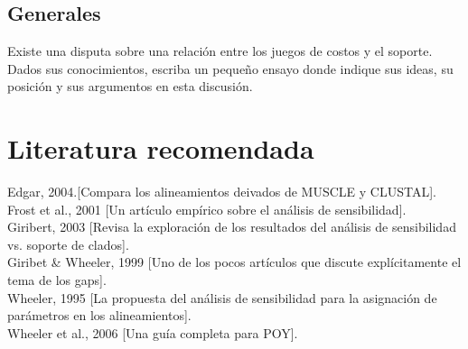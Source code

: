 \subsection{Generales}
\noindent
Existe una disputa sobre una relaci\'on entre los juegos de costos y el soporte. Dados sus conocimientos, escriba un 
peque\~no ensayo donde indique sus ideas, su posici\'on y sus argumentos en esta discusi\'on.
\section{Literatura recomendada}
\noindent
Edgar, 2004.[Compara los alineamientos deivados de MUSCLE y CLUSTAL].\\
Frost et al., 2001 [Un art\'iculo emp\'irico sobre el an\'alisis de sensibilidad].\\
Giribert, 2003 [Revisa la exploraci\'on de los resultados del an\'alisis de sensibilidad vs. soporte de clados].\\
Giribet \& Wheeler, 1999 [Uno de los pocos art\'iculos que discute expl\'icitamente el tema de los gaps].\\
Wheeler, 1995 [La propuesta del an\'alisis de sensibilidad para la asignaci\'on de par\'ametros en los alineamientos].\\
Wheeler et al., 2006 [Una gu\'ia completa para POY].
